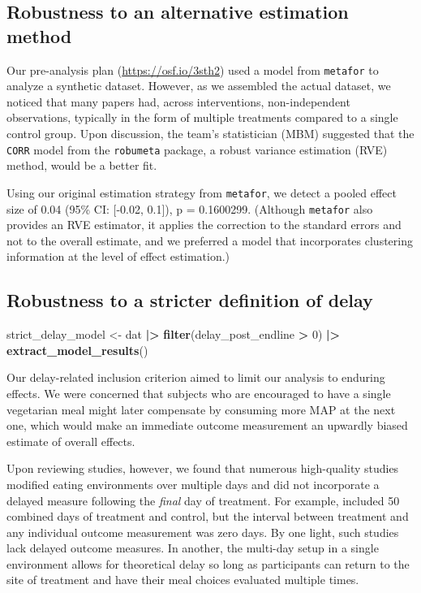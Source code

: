 \documentclass[sn-nature,referee,pdflatex]{sn-jnl}
\newenvironment{Shaded}{\begin{snugshade}}{\end{snugshade}}
\newcommand{\DecValTok}[1]{\textcolor[rgb]{0.00,0.00,0.81}{#1}}
\newcommand{\FunctionTok}[1]{\textcolor[rgb]{0.13,0.29,0.53}{\textbf{#1}}}
\newcommand{\NormalTok}[1]{#1}
\newcommand{\OtherTok}[1]{\textcolor[rgb]{0.56,0.35,0.01}{#1}}
\newcommand{\SpecialCharTok}[1]{\textcolor[rgb]{0.81,0.36,0.00}{\textbf{#1}}}
\begin{document}
\subsection{Robustness to an alternative estimation
method}\label{Sec5.1.2}

Our pre-analysis plan (\url{https://osf.io/3sth2}) used a model from
\texttt{metafor} to analyze a synthetic dataset. However, as we
assembled the actual dataset, we noticed that many papers had, across
interventions, non-independent observations, typically in the form of
multiple treatments compared to a single control group. Upon discussion,
the team's statistician (MBM) suggested that the \texttt{CORR} model
from the \texttt{robumeta} package, a robust variance estimation (RVE)
method, would be a better fit.

Using our original estimation strategy from \texttt{metafor}, we detect
a pooled effect size of 0.04 (95\% CI: {[}-0.02, 0.1{]}), p = 0.1600299.
(Although \texttt{metafor} also provides an RVE estimator, it applies
the correction to the standard errors and not to the overall estimate,
and we preferred a model that incorporates clustering information at the
level of effect estimation.)

\subsection{Robustness to a stricter definition of
delay}\label{Sec5.1.3}

\begin{Shaded}
\begin{Highlighting}[]
\NormalTok{strict\_delay\_model }\OtherTok{\textless{}{-}}\NormalTok{ dat }\SpecialCharTok{|\textgreater{}} \FunctionTok{filter}\NormalTok{(delay\_post\_endline }\SpecialCharTok{\textgreater{}} \DecValTok{0}\NormalTok{) }\SpecialCharTok{|\textgreater{}} \FunctionTok{extract\_model\_results}\NormalTok{()}
\end{Highlighting}
\end{Shaded}

Our delay-related inclusion criterion aimed to limit our analysis to
enduring effects. We were concerned that subjects who are encouraged to
have a single vegetarian meal might later compensate by consuming more
MAP at the next one, which would make an immediate outcome measurement
an upwardly biased estimate of overall effects.

Upon reviewing studies, however, we found that numerous high-quality
studies modified eating environments over multiple days and did not
incorporate a delayed measure following the \emph{final} day of
treatment. For example, \citep{andersson2021} included 50 combined days
of treatment and control, but the interval between treatment and any
individual outcome measurement was zero days. By one light, such studies
lack delayed outcome measures. In another, the multi-day setup in a
single environment allows for theoretical delay so long as participants
can return to the site of treatment and have their meal choices
evaluated multiple times.
\end{document}
